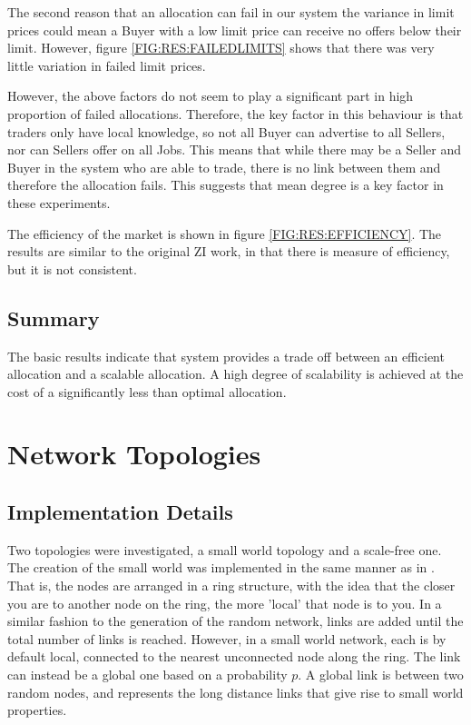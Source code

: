 The second reason that an allocation can fail in our system the variance in
limit prices could mean a Buyer with a low limit price can receive no
offers below their limit. However, figure \ref{FIG:RES:FAILEDLIMITS} shows
that there was very little variation in failed limit prices.

However, the above factors do not seem to play a significant part in high
proportion of failed allocations. Therefore, the key factor in this behaviour
is that traders only have local knowledge, so not all Buyer can advertise to
all Sellers, nor can Sellers offer on all Jobs.  This means that while there
may be a Seller and Buyer in the system who are able to trade, there is no link
between them and therefore the allocation fails. This suggests that mean degree
is a key factor in these experiments.

The efficiency of the market is shown in figure \ref{FIG:RES:EFFICIENCY}. The
results are similar to the original ZI work, in that there is measure of
efficiency, but it is not consistent.

\subsection{Summary}

The basic results indicate that system provides a trade off between an
efficient allocation and a scalable allocation.  A high degree of scalability
is achieved at the cost of a significantly less than optimal allocation. 


\section{Network Topologies}

\subsection{Implementation Details}
\label{SEC:RESULTS:NETWORKS}

Two topologies were investigated, a small world topology and a scale-free one.
The creation of the small world was implemented in the same manner as in
\cite{net-watts98-smallworld}. That is, the nodes are arranged in a ring
structure, with the idea that the closer you are to another node on the ring,
the more 'local' that node is to you. In a similar fashion to the generation of
the random network, links are added until the total number of links is reached.
However, in a small world network, each is by default local, connected to the
nearest unconnected node along the ring. The link can instead be a global one
based on a probability $p$. A global link is between two random nodes, and
represents the long distance links that give rise to small world properties.

